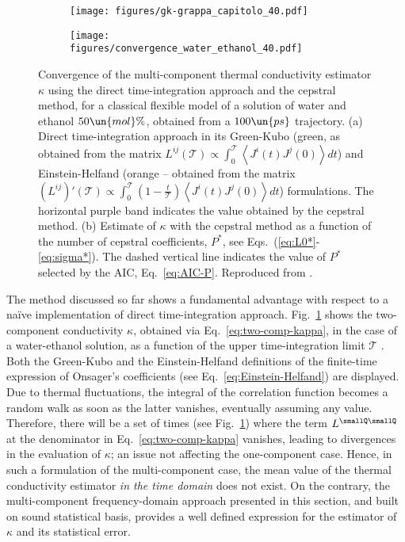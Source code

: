 \begin{figure}
    \centering
    \begin{subfigure}[tb]{1\textwidth}
    	\centering
        \texttt{[image: figures/gk-grappa\_capitolo\_40.pdf]}
        \caption{}
    \end{subfigure}

    \begin{subfigure}[tb]{1\textwidth}
    	\centering
        \texttt{[image: figures/convergence\_water\_ethanol\_40.pdf]}
        \caption{}
    \end{subfigure}
	\caption{Convergence of the multi-component thermal conductivity estimator $\kappa$ using the direct time-integration approach and the cepstral method, for a classical flexible model of a solution of water and ethanol $50\un{mol}\%$, obtained from a $100\un{ps}$ trajectory.
(a) Direct time-integration approach in its Green-Kubo (green, as obtained from the matrix $L^{ij}(\mathcal{T})\propto\int_0^\mathcal{T} \left\langle J^i(t) J^j(0) \right\rangle dt $) and Einstein-Helfand (orange -- obtained from the  matrix $\left (L^{ij}\right )'(\mathcal{T}) \propto  \int_0^\mathcal{T}\left(1-\frac{t}{\mathcal{T}}\right) \left \langle J^i(t) J^j(0) \right \rangle dt$) formulations. The horizontal purple band indicates the value obtained by the cepstral method.
(b) Estimate of $\kappa$ with the cepstral method as a function of the number of cepstral coefficients, $P^*$, see Eqs.~(\ref{eq:L0*}-\ref{eq:sigma*}). The dashed vertical line indicates the value of $P^*$ selected by the AIC, Eq.~\eqref{eq:AIC-P}. Reproduced from \cite{Bertossa2018}.
}  \label{fig:twoCompConvergence}
\end{figure}

The method discussed so far shows a fundamental advantage with respect to a na\"ive implementation of direct time-integration approach.
Fig.~\ref{fig:twoCompConvergence} shows the two-component conductivity $\kappa$, obtained via Eq.~\eqref{eq:two-comp-kappa}, in the case of a water-ethanol solution, as a function of the upper time-integration limit $\mathcal{T}$ \citep{Bertossa2018}. Both the Green-Kubo and the Einstein-Helfand definitions of the finite-time expression of Onsager's coefficients (see Eq.~\eqref{eq:Einstein-Helfand}) are displayed.
Due to thermal fluctuations, the integral of the correlation function becomes a random walk as soon as the latter vanishes, eventually assuming any value. Therefore, there will be a set of times (see Fig.~\ref{fig:twoCompConvergence}) where the term $L^{\smallQ\smallQ}$ at the denominator in Eq.~\eqref{eq:two-comp-kappa} vanishes, leading to divergences in the evaluation of $\kappa$; an issue not affecting the one-component case. Hence, in such a formulation of the multi-component case, the mean value of the thermal conductivity estimator \textit{in the time domain} does not exist. On the contrary, the multi-component frequency-domain approach presented in this section, and built on sound statistical basis, provides a well defined expression for the estimator of $\kappa$ and its statistical error.


